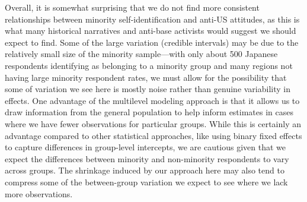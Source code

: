Overall, it is somewhat surprising that we do not find more consistent relationships between minority self-identification and anti-US attitudes, as this is what many historical narratives and anti-base activists would suggest we should expect to find. Some of the large variation (credible intervals) may be due to the relatively small size of the minority sample---with only about 500 Japanese respondents identifying as belonging to a minority group and many regions not having large minority respondent rates, we must allow for the possibility that some of variation we see here is mostly noise rather than genuine variability in effects. One advantage of the multilevel modeling approach is that it allows us to draw information from the general population to help inform estimates in cases where we have fewer observations for particular groups. While this is certainly an advantage compared to other statistical approaches, like using binary fixed effects to capture differences in group-level intercepts, we are cautious given that we expect the differences between minority and non-minority respondents to vary across groups. The shrinkage induced by our approach here may also tend to compress some of the between-group variation we expect to see where we lack more observations.